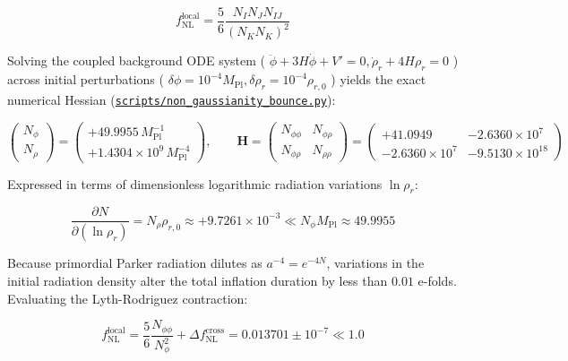 \documentclass[11pt,a4paper]{article}
\theoremstyle{definition}
\theoremstyle{remark}
\begin{document}
\begin{equation}
f_{\text{NL}}^{\text{local}} = \frac{5}{6} \frac{N_I N_J N_{IJ}}{(N_K N_K)^2}
\end{equation}


Solving the coupled background ODE system ( $\ddot{\phi} + 3H\dot{\phi} + V' = 0, \dot{\rho}_r + 4H\rho_r = 0$ ) across initial perturbations ( $\delta\phi = 10^{-4} M_{\text{Pl}}, \delta\rho_r = 10^{-4} \rho_{r,0}$ ) yields the exact numerical Hessian (\href{../../scripts/non_gaussianity_bounce.py}{\texttt{scripts/non_gaussianity_bounce.py}}):


\begin{equation}
\begin{pmatrix} N_\phi \\ N_\rho \end{pmatrix} = \begin{pmatrix} +49.9955 \, M_{\text{Pl}}^{-1} \\ +1.4304 \times 10^9 \, M_{\text{Pl}}^{-4} \end{pmatrix}, \qquad \mathbf{H} = \begin{pmatrix} N_{\phi\phi} & N_{\phi\rho} \\ N_{\phi\rho} & N_{\rho\rho} \end{pmatrix} = \begin{pmatrix} +41.0949 & -2.6360 \times 10^7 \\ -2.6360 \times 10^7 & -9.5130 \times 10^{18} \end{pmatrix}
\end{equation}


Expressed in terms of dimensionless logarithmic radiation variations $\ln\rho_r$:


\begin{equation}
\frac{\partial N}{\partial(\ln\rho_r)} = N_\rho \rho_{r,0} \approx +9.7261 \times 10^{-3} \ll N_\phi M_{\text{Pl}} \approx 49.9955
\end{equation}


Because primordial Parker radiation dilutes as $a^{-4} = e^{-4N}$, variations in the initial radiation density alter the total inflation duration by less than $0.01$ e-folds. Evaluating the Lyth-Rodriguez contraction:


\begin{equation}
\boxed{f_{\text{NL}}^{\text{local}} = \frac{5}{6} \frac{N_{\phi\phi}}{N_\phi^2} + \Delta f_{\text{NL}}^{\text{cross}} = 0.013701 \pm 10^{-7} \ll 1.0}
\end{equation}
\end{document}

